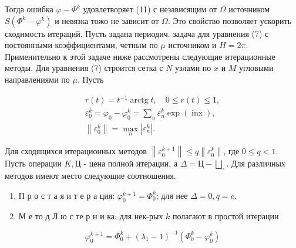 \documentclass[10pt]{article}
\begin{document}
Тогда ошибка $\varphi-\Phi^{k}$ удовлетворяет (11) с независящим от $\Omega$ источником $S\left(\Phi^{k}-\varphi^{k}\right)$ и невязка тожө не зависит от $\Omega$. Это свойство позволяет ускорить сходимость итераций. Пусть задана периодич. задача для уравнения (7) с постоянными коэффициентами, четным по $\mu$ источником и $H=2 \pi$. Применительно к этой задаче ниже рассмотрены следующие итерационные методы. Для уравнения (7) строится сетка с $N$ узлами по $x$ и $M$ угловыми направлениями по $\mu$. Пусть



\[

\begin{gathered}

r(t)=t^{-1} \operatorname{arctg} t, \quad 0 \leqslant r(t) \leqslant 1, \\

\varepsilon_{0}^{k}=\varphi_{0}-\varphi_{0}^{k}=\sum_{n} \varepsilon_{n}^{k} \exp (\operatorname{inx}), \\

\left\|\varepsilon_{0}^{k}\right\|=\max _{n}\left|\varepsilon_{n}^{k}\right| .

\end{gathered}

\]



Для сходящихся итерационных методов $\left\|\varepsilon_{0}^{k+1}\right\| \leqslant q\left\|\varepsilon_{0}^{k}\right\|$, где $0 \leqslant q<1$. Пусть операции $K, Ц$ - цена полной итерации, а $\Delta=Ц-\bigsqcup_{\circ}$. Для различных методов имеют место следующие соотношения.



\begin{enumerate}

  \item П р о с т а я и т е р а ция: $\varphi_{0}^{k+1}=\Phi_{0}^{k}$; для нее $\Delta=0, q=c$.



  \item М е то д Л ю с те р н и ка: для нек-рых $k$ полагают в простой итерации



\end{enumerate}



\[

\varphi_{0}^{k+1}=\Phi_{0}^{k}+\left(\lambda_{1}-1\right)^{-1}\left(\Phi_{0}^{k}-\varphi_{0}^{k}\right)

\]
\end{document}
